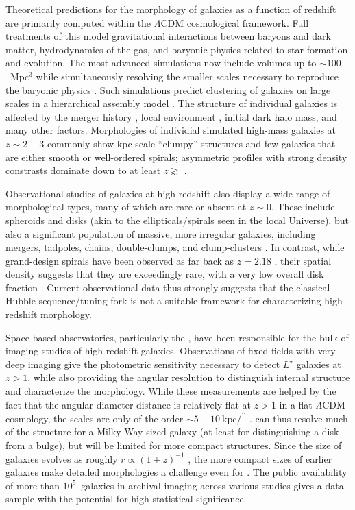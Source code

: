 \documentclass[twocolumn]{aastex6}
\begin{document}
Theoretical predictions for the morphology of galaxies as a function of redshift are primarily computed within the $\Lambda$CDM cosmological framework. Full treatments of this model gravitational interactions between baryons and dark matter, hydrodynamics of the gas, and baryonic physics related to star formation and evolution. The most advanced simulations now include volumes up to $\sim100$~Mpc$^3$ while simultaneously resolving the smaller scales necessary to reproduce the baryonic physics \citep{vog14a,sch15}. Such simulations predict clustering of galaxies on large scales in a hierarchical assembly model \citep{sil12}. The structure of individual galaxies is affected by the merger history \citep{too72,hop10}, local environment \citep[such as the morphology-density relation;][]{dre80}, initial dark halo mass, and many other factors. Morphologies of individial simulated high-mass galaxies at $z\sim2-3$ commonly show kpc-scale ``clumpy'' structures and few galaxies that are either smooth or well-ordered spirals; asymmetric profiles with strong density constrasts dominate down to at least $z\gtrsim$ \citep{gen14}. 

Observational studies of galaxies at high-redshift also display a wide range of morphological types, many of which are rare or absent at $z\sim0$. These include spheroids and disks (akin to the ellipticals/spirals seen in the local Universe), but also a significant population of massive, more irregular galaxies, including mergers, tadpoles, chains, double-clumps, and clump-clusters \citep{elm05,elm07,cam11a,for11a,kar15}. In contrast, while grand-design spirals have been observed as far back as $z=2.18$ \citep{law12}, their spatial density suggests that they are exceedingly rare, with a very low overall disk fraction \citep{mor13}. Current observational data thus strongly suggests that the classical Hubble sequence/tuning fork \citep{hub36} is not a suitable framework for characterizing high-redshift morphology. 

Space-based observatories, particularly the \hubble, have been responsible for the bulk of imaging studies of high-redshift galaxies. Observations of fixed fields with very deep imaging \citep[eg,][]{wil96,gia04,bec06,dav07,sco07,gro11} give the photometric sensitivity necessary to detect $L^\star$ galaxies at $z>1$, while also providing the angular resolution to distinguish internal structure and characterize the morphology. While these measurements are helped by the fact that the angular diameter distance is relatively flat at $z>1$ in a flat $\Lambda$CDM cosmology, the scales are only of the order $\sim5-10~\mathrm{kpc}/^{\prime\prime}$ \citep{wri06}. \hst{} can thus resolve much of the structure for a Milky Way-sized galaxy (at least for distinguishing a disk from a bulge), but will be limited for more compact structures. Since the size of galaxies evolves as roughly $r\propto(1+z)^{-1}$ \citep{law12a}, the more compact sizes of earlier galaxies make detailed morphologies a challenge even for \hst{} \citep{che12}. The public availability of more than $10^5$~galaxies in archival imaging across various studies gives a data sample with the potential for high statistical significance. 
\end{document}
